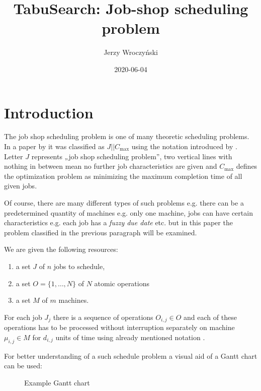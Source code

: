 \documentclass[14pt]{article}
\title{TabuSearch: Job-shop scheduling problem}
\author{Jerzy Wroczyński}
\date{2020-06-04}
\begin{document}
\maketitle

\section{Introduction}

The job shop scheduling problem is one of many theoretic scheduling problems. In a paper by \citet{amico-trubian} it was classified as $J || C_{\max}$ using the notation introduced by \citet{graham}. Letter $J$ represents „job shop scheduling problem”, two vertical lines with nothing in between mean no further job characteristics are given and $C_{\max}$ defines the optimization problem as minimizing the maximum completion time of all given jobs.

Of course, there are many different types of such problems e.g. there can be a predetermined quantity of machines e.g. only one machine, jobs can have certain characteristics e.g. each job has a \textit{fuzzy due date} etc. but in this paper the problem classified in the previous paragraph will be examined.

\hspace{2pt}

We are given the following resources:
\begin{enumerate}
  \item a set $J$ of $n$ jobs to schedule,
  \item a set $O = \{1,\dots,N\}$ of $N$ atomic operations
  \item a set $M$ of $m$ machines.
\end{enumerate}

For each job $J_j$ there is a sequence of operations $O_{i,j} \in O$ and each of these operations has to be processed without interruption separately on machine $\mu_{i,j} \in M$ for $d_{i,j}$ units of time using already mentioned notation \cite{graham}.

For better understanding of a such schedule problem a visual aid of a Gantt chart can be used:
\begin{figure}
  \centering

  \caption{Example Gantt chart}
  \label{example-gantt}
\end{figure}



\end{document}
